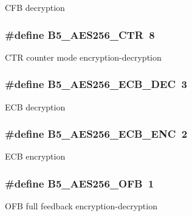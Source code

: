 C\-F\-B decryption \hypertarget{group__aes_modes_gada09a78164ed48a74b4320a0a3ccf7dd}{
\subsubsection[{B5\-\_\-\-A\-E\-S256\-\_\-\-C\-T\-R}]{\setlength{\rightskip}{0pt plus 5cm}\#define B5\-\_\-\-A\-E\-S256\-\_\-\-C\-T\-R~8}}\label{group__aes_modes_gada09a78164ed48a74b4320a0a3ccf7dd}
C\-T\-R counter mode encryption-\/decryption \hypertarget{group__aes_modes_ga7cc574715866041d7702bc928392b34d}{
\subsubsection[{B5\-\_\-\-A\-E\-S256\-\_\-\-E\-C\-B\-\_\-\-D\-E\-C}]{\setlength{\rightskip}{0pt plus 5cm}\#define B5\-\_\-\-A\-E\-S256\-\_\-\-E\-C\-B\-\_\-\-D\-E\-C~3}}\label{group__aes_modes_ga7cc574715866041d7702bc928392b34d}
E\-C\-B decryption \hypertarget{group__aes_modes_gaa10e7bc21ff6269423c0843ab06523de}{
\subsubsection[{B5\-\_\-\-A\-E\-S256\-\_\-\-E\-C\-B\-\_\-\-E\-N\-C}]{\setlength{\rightskip}{0pt plus 5cm}\#define B5\-\_\-\-A\-E\-S256\-\_\-\-E\-C\-B\-\_\-\-E\-N\-C~2}}\label{group__aes_modes_gaa10e7bc21ff6269423c0843ab06523de}
E\-C\-B encryption \hypertarget{group__aes_modes_gaa6e9c20473b20e271d541e65ad22b31a}{
\subsubsection[{B5\-\_\-\-A\-E\-S256\-\_\-\-O\-F\-B}]{\setlength{\rightskip}{0pt plus 5cm}\#define B5\-\_\-\-A\-E\-S256\-\_\-\-O\-F\-B~1}}\label{group__aes_modes_gaa6e9c20473b20e271d541e65ad22b31a}
O\-F\-B full feedback encryption-\/decryption 